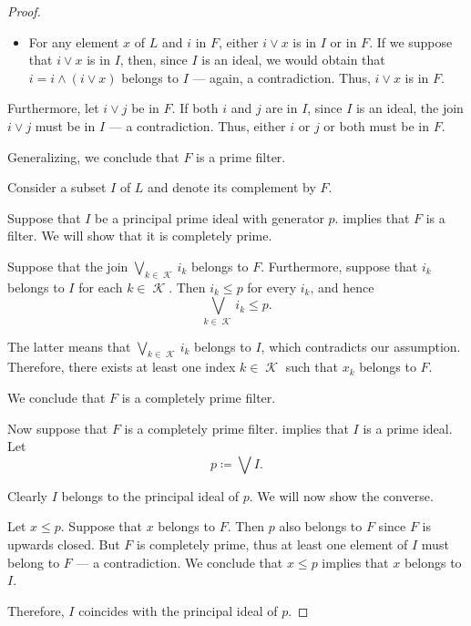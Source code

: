 \begin{proof}
\begin{itemize}
    \item For any element \( x \) of \( L \) and \( i \) in \( F \), either \( i \vee x \) is in \( I \) or in \( F \). If we suppose that \( i \vee x \) is in \( I \), then, since \( I \) is an ideal, we would obtain that \( i = i \wedge (i \vee x) \) belongs to \( I \) --- again, a contradiction. Thus, \( i \vee x \) is in \( F \).
  \end{itemize}

  Furthermore, let \( i \vee j \) be in \( F \). If both \( i \) and \( j \) are in \( I \), since \( I \) is an ideal, the join \( i \vee j \) must be in \( I \) --- a contradiction. Thus, either \( i \) or \( j \) or both must be in \( F \).

  Generalizing, we conclude that \( F \) is a prime filter.

   Consider a subset \( I \) of \( L \) and denote its complement by \( F \).

  \SufficiencySubProof* Suppose that \( I \) be a principal prime ideal with generator \( p \).  implies that \( F \) is a filter. We will show that it is completely prime.

  Suppose that the join \( \bigvee_{k \in \mscrK} i_k \) belongs to \( F \). Furthermore, suppose that \( i_k \) belongs to \( I \) for each \( k \in \mscrK \). Then \( i_k \leq p \) for every \( i_k \), and hence
  \begin{equation*}
    \bigvee_{k \in \mscrK} i_k \leq p.
  \end{equation*}

  The latter means that \( \bigvee_{k \in \mscrK} i_k \) belongs to \( I \), which contradicts our assumption. Therefore, there exists at least one index \( k \in \mscrK \) such that \( x_k \) belongs to \( F \).

  We conclude that \( F \) is a completely prime filter.

  \NecessitySubProof* Now suppose that \( F \) is a completely prime filter.  implies that \( I \) is a prime ideal. Let
  \begin{equation*}
    p \coloneqq \bigvee I.
  \end{equation*}

  Clearly \( I \) belongs to the principal ideal of \( p \). We will now show the converse.

  Let \( x \leq p \). Suppose that \( x \) belongs to \( F \). Then \( p \) also belongs to \( F \) since \( F \) is upwards closed. But \( F \) is completely prime, thus at least one element of \( I \) must belong to \( F \) --- a contradiction. We conclude that \( x \leq p \) implies that \( x \) belongs to \( I \).

  Therefore, \( I \) coincides with the principal ideal of \( p \).
\end{proof}

